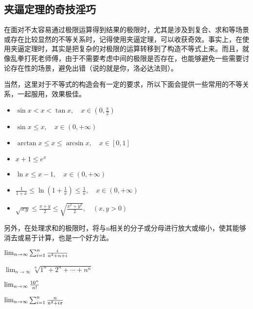 \subsection{夹逼定理的奇技淫巧}

在面对不太容易通过极限运算得到结果的极限时，尤其是涉及到复合、求和等场景或存在比较显然的不等关系时，记得使用夹逼定理，可以收获奇效。事实上，在使用夹逼定理时，其实是把复杂的对极限的运算转移到了构造不等式上来。而且，就像乱拳打死老师傅，由于不需要考虑中间的极限是否存在，也能够避免一些需要讨论存在性的场景，避免出错（说的就是你，洛必达法则）。

当然，这里对于不等式的构造会有一定的要求，所以下面会提供一些常用的不等关系，一起服用，效果极佳。

\begin{itemize}
\item $\sin x < x < \tan x, \quad x \in \left(0, \frac{\pi}{2}\right)$
\item $\sin x \leq x, \quad x \in (0, +\infty)$
\item $\arctan x \leq x \leq \arcsin x, \quad x \in [0, 1] $
\item $x + 1\leq e^x$
\item $\ln x\leq x - 1 , \quad x \in (0, +\infty)$
\item $\frac{1}{1 + x} \leq \ln\left(1 + \frac{1}{x}\right) \leq \frac{1}{x}, \quad x \in (0, +\infty)$
\item $\sqrt{xy} \leq \frac{x + y}{2} \leq \sqrt{\frac{x^2 + y^2}{2}}, \quad (x, y > 0)$
\end{itemize}

\begin{example}{}

\end{example}
另外，在处理求和的极限时，将与n相关的分子或分母进行放大或缩小，使其能够消去或易于计算，也是一个好方法。
\begin{example}{$\lim_{n\to \infty}\sum_{i=1}^n{i\over n^2+n+i}$}
\end{example}



\begin{example}{$\lim_{n\to\infty}\sqrt[n]{1^n+2^n+\cdots+n^n}$}

\end{example}
\begin{example}{$\lim_{n\to\infty}{10^n\over n!}$}

\end{example}
\begin{example}{$\lim_{n\to\infty}\sum_{i=1}^n{n\over n^2+i\pi}$}

\end{example}

